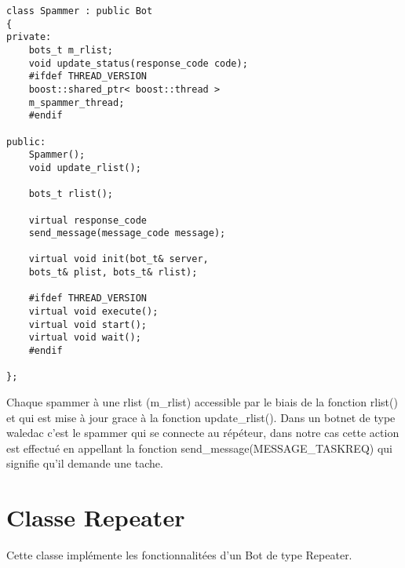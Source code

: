 \documentclass[11pt]{article}
\begin{document}
\begin{minipage}[c]{.46\linewidth}
\begin{verbatim} 
class Spammer : public Bot
{
private:
	bots_t m_rlist;
	void update_status(response_code code);
	#ifdef THREAD_VERSION
	boost::shared_ptr< boost::thread > 
	m_spammer_thread;
	#endif
	
public:
	Spammer();
	void update_rlist();
	
	bots_t rlist();
	
	virtual response_code 
	send_message(message_code message);
	
	virtual void init(bot_t& server, 
	bots_t& plist, bots_t& rlist);
	
	#ifdef THREAD_VERSION
	virtual void execute();
	virtual void start();
	virtual void wait();
	#endif

};
\end{verbatim}	
\end{minipage} \hfill
\begin{minipage}[c]{.46\linewidth}
Chaque spammer à une rlist (m\_rlist) accessible par le biais de la fonction rlist() et qui est mise à jour grace à la fonction update\_rlist(). 
Dans un botnet de type waledac c'est le spammer qui se connecte au répéteur, dans notre cas cette action est effectué en appellant la fonction 
send\_message(MESSAGE\_TASKREQ) qui signifie qu'il demande une tache.
\end{minipage}

\newpage
\section{Classe Repeater}
Cette classe implémente les fonctionnalitées d'un Bot de type Repeater.\\
\end{document}
